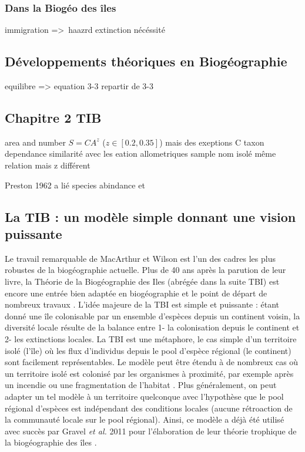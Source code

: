 \subsubsection*{Dans la Biogéo des
îles}\label{dans-la-bioguxe9o-des-uxeeles}

immigration =\textgreater{}~haazrd extinction nécéssité

\subsection*{Développements théoriques en
Biogéographie}\label{duxe9veloppements-thuxe9oriques-en-bioguxe9ographie}

equilibre =\textgreater{} equation 3-3 repartir de 3-3

\subsection{Chapitre 2 TIB}\label{chapitre-2-tib}

area and number \(S=CA^z\) (\(z \in [0.2,0.35]\)) mais des exeptions C
taxon dependance similarité avec les eation allometriques sample nom
isolé même relation mais z différent

Preston 1962 a lié species abindance et

\subsection{La TIB : un modèle simple donnant une vision
puissante}\label{la-tib-un-moduxe8le-simple-donnant-une-vision-puissante}

Le travail remarquable de MacArthur et Wilson \cite{MacArthur1967} est
l'un des cadres les plus robustes de la biogéographie actuelle. Plus de
40 ans après la parution de leur livre, la Théorie de la Biogéographie
des Iles (abrégée dans la suite TBI) est encore une entrée bien adaptée
en biogéographie et le point de départ de nombreux travaux
\cite{Gravel2011b,Ryberg2007,Rosindell2011}. L'idée majeure de la TBI
est simple et puissante : étant donné une île colonisable par un
ensemble d'espèces depuis un continent voisin, la diversité locale
résulte de la balance entre 1- la colonisation depuis le continent et 2-
les extinctions locales. La TBI est une métaphore, le cas simple d'un
territoire isolé (l'île) où les flux d'individus depuis le pool d'espèce
régional (le continent) sont facilement représentables. Le modèle peut
être étendu à de nombreux cas où un territoire isolé est colonisé par
les organismes à proximité, par exemple après un incendie ou une
fragmentation de l'habitat \cite{Cook2002}. Plus généralement, on peut
adapter un tel modèle à un territoire quelconque avec l'hypothèse que le
pool régional d'espèces est indépendant des conditions locales (aucune
rétroaction de la communauté locale sur le pool régional). Ainsi, ce
modèle a déjà été utilisé avec succès par Gravel \textit{et al.} 2011
pour l'élaboration de leur théorie trophique de la biogéographie des
îles \cite{Gravel2011b}.

